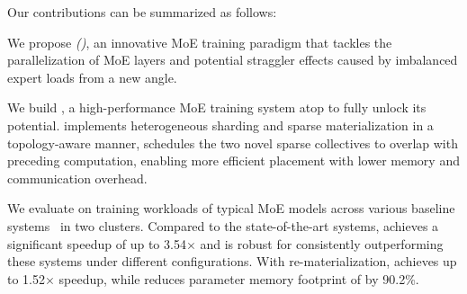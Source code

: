 Our contributions can be summarized as follows:
\begin{niceritemize}
    \item We propose \textit{\YYY (\yyy)}, an innovative MoE training paradigm that tackles the parallelization of MoE layers and potential straggler effects caused by imbalanced expert loads from a new angle.
    \item We build \xxx, a high-performance MoE training system atop \yyy to fully unlock its potential.
    \xxx implements heterogeneous sharding and sparse materialization in a topology-aware manner, schedules the two novel sparse collectives to overlap with preceding computation, enabling more efficient placement with lower memory and communication overhead.
    \item We evaluate \xxx on training workloads of typical MoE models across various baseline systems~\cite{he2022fastermoe,nie2023flexmoe,zhai2023smartmoe} in two clusters.
    Compared to the state-of-the-art systems, \xxx achieves a significant speedup of up to 3.54$\times$ and is robust for consistently outperforming these systems under different configurations.
    With re-materialization, \xxx achieves up to 1.52$\times$ speedup, while reduces parameter memory footprint of \xxx by 90.2\%.
\end{niceritemize}







